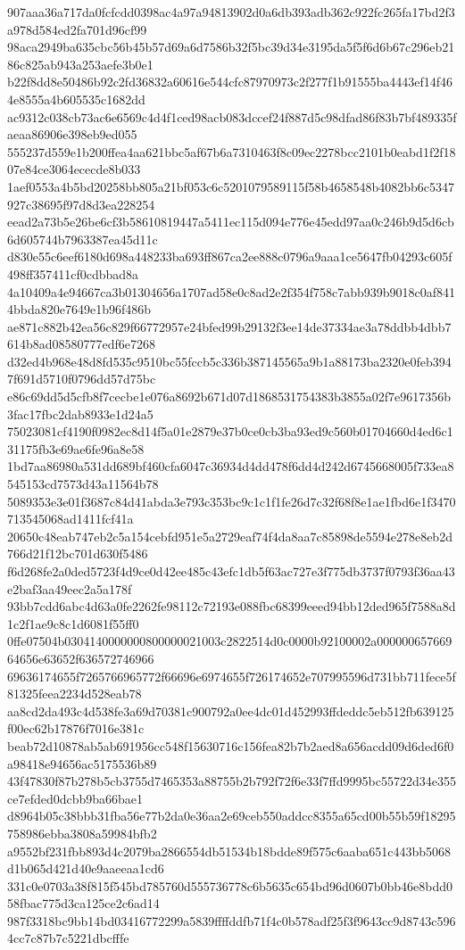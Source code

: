 {907aaa36a717da0fcfcdd0398ac4a97a94813902d0a6db393adb362c922fc265fa17bd2f3a978d584ed2fa701d96cf99
98aca2949ba635cbc56b45b57d69a6d7586b32f5bc39d34e3195da5f5f6d6b67c296eb2186c825ab943a253aefe3b0e1
b22f8dd8e50486b92c2fd36832a60616e544cfc87970973c2f277f1b91555ba4443ef14f464e8555a4b605535c1682dd
ac9312c038cb73ac6e6569c4d4f1ced98acb083dccef24f887d5c98dfad86f83b7bf489335faeaa86906e398eb9ed055
555237d559e1b200ffea4aa621bbc5af67b6a7310463f8c09ec2278bcc2101b0eabd1f2f1807e84ce3064ececde8b033
1aef0553a4b5bd20258bb805a21bf053c6c5201079589115f58b4658548b4082bb6c5347927c38695f97d8d3ea228254
eead2a73b5e26be6cf3b58610819447a5411ec115d094e776e45edd97aa0c246b9d5d6cb6d605744b7963387ea45d11c
d830e55c6eef6180d698a448233ba693ff867ca2ee888c0796a9aaa1ce5647fb04293c605f498ff357411cf0cdbbad8a
4a10409a4e94667ca3b01304656a1707ad58e0c8ad2e2f354f758c7abb939b9018c0af8414bbda820e7649e1b96f486b
ae871c882b42ea56c829f66772957e24bfed99b29132f3ee14de37334ae3a78ddbb4dbb7614b8ad08580777edf6e7268
d32ed4b968e48d8fd535c9510bc55fccb5c336b387145565a9b1a88173ba2320e0feb3947f691d5710f0796dd57d75bc
e86c69dd5d5cfb8f7cecbe1e076a8692b671d07d1868531754383b3855a02f7e9617356b3fac17fbc2dab8933e1d24a5
75023081cf4190f0982ec8d14f5a01e2879e37b0ce0cb3ba93ed9c560b01704660d4ed6c131175fb3e69ae6fe96a8e58
1bd7aa86980a531dd689bf460cfa6047c36934d4dd478f6dd4d242d6745668005f733ea8545153cd7573d43a11564b78
5089353e3e01f3687c84d41abda3e793c353bc9c1c1f1fe26d7c32f68f8e1ae1fbd6e1f3470713545068ad1411fcf41a
20650c48eab747eb2c5a154cebfd951e5a2729eaf74f4da8aa7c85898de5594e278e8eb2d766d21f12bc701d630f5486
f6d268fe2a0ded5723f4d9ce0d42ee485c43efc1db5f63ac727e3f775db3737f0793f36aa43e2baf3aa49eec2a5a178f
93bb7cdd6abc4d63a0fe2262fe98112c72193e088fbc68399eeed94bb12ded965f7588a8d1c2f1ae9c8c1d6081f55ff0
0ffe07504b0304140000000800000021003c2822514d0c0000b92100002a00000065766964656e63652f636572746966
69636174655f7265766965772f66696e6974655f726174652e707995596d731bb711fece5f81325feea2234d528eab78
aa8cd2da493c4d538fe3a69d70381c900792a0ee4dc01d452993ffdeddc5eb512fb639125f00ec62b17876f7016e381c
beab72d10878ab5ab691956cc548f15630716c156fea82b7b2aed8a656acdd09d6ded6f0a98418e94656ac5175536b89
43f47830f87b278b5cb3755d7465353a88755b2b792f72f6e33f7ffd9995bc55722d34e355ce7efded0dcbb9ba66bae1
d8964b05c38bbb31fba56e77b2da0e36aa2e69ceb550addcc8355a65cd00b55b59f18295758986ebba3808a59984bfb2
a9552bf231fbb893d4c2079ba2866554db51534b18bdde89f575c6aaba651c443bb5068d1b065d421d40e9aaeeaa1cd6
331c0e0703a38f815f545bd785760d555736778c6b5635c654bd96d0607b0bb46e8bdd058fbac775d3ca125ce2c6ad14
987f3318bc9bb14bd03416772299a5839ffffddfb71f4c0b578adf25f3f9643cc9d8743c5964cc7c87b7c5221dbcfffe
}
